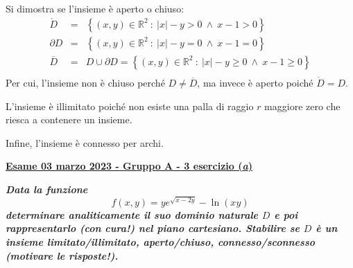 \documentclass[a4paper]{article}
\newcommand{\definition}[1]{\textcolor{Red3}{\textbf{#1}}}
\newcommand{\example}[1]{\textcolor{Green4}{\textbf{#1}}}
\begin{document}
	\noindent
	Si dimostra se l'insieme è aperto o chiuso:
	\begin{equation*}
		\begin{array}{rcl}
			\mathring{D} &=& \left\{\left(x,y\right) \in \mathbb{R}^{2} \: : \: \left|x\right|-y > 0 \: \land \: x-1 > 0\right\} \\ [.3em]
			\partial {D} &=& \left\{\left(x,y\right) \in \mathbb{R}^{2} \: : \: \left|x\right|-y = 0 \: \land \: x-1 = 0\right\} \\ [.3em]
			\overline{D} &=& D \cup \partial D = \left\{\left(x,y\right) \in \mathbb{R}^{2} \: : \: \left|x\right|-y \ge 0 \: \land \: x-1 \ge 0\right\} \\
		\end{array}
	\end{equation*}
	Per cui, l'insieme non è chiuso perché $D \ne \overline{D}$, ma invece è aperto poiché $\mathring{D} = D$.

	L'insieme è illimitato poiché non esiste una palla di raggio $r$ maggiore zero che riesca a contenere un insieme.

	Infine, l'insieme è connesso per archi.\newpage

	\begin{flushleft}
		\label{exam: esame 03 marzo 2023 - Gruppo A - 3 esercizio (a)}
		\hypertarget{
			exam: esame 03 marzo 2023 - Gruppo A - 3 esercizio (a)
		}{
			\definition{\underline{Esame 03 marzo 2023 - Gruppo A - 3 esercizio (\emph{a})}}
		}
	\end{flushleft}
	\example{\emph{Data la funzione}
	\begin{equation*}
		f\left(x,y\right) = y e^{\sqrt{x-2y}}-\ln\left(xy\right)
	\end{equation*}
	\emph{determinare analiticamente il suo dominio naturale $D$ e poi rappresentarlo (con cura!) nel piano cartesiano. Stabilire se $D$ è un insieme limitato/illimitato, aperto/chiuso, connesso/sconnesso (motivare le risposte!).}}\newline
\end{document}
